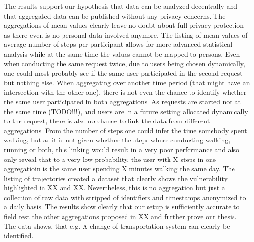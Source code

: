 The results support our hypothesis that data can be analyzed decentrally and that aggregated data can be published without any privacy concerns. The aggregations of mean values clearly leave no doubt about full privacy protection as there even is no personal data involved anymore. The listing of mean values of average number of steps per participant allows for more advanced statistical analysis while at the same time the values cannot be mapped to persons. Even when conducting the same request twice, due to users being chosen dynamically, one could most probably see if the same user participated in the second request but nothing else. When aggregating over another time period (that might have an intersection with the other one), there is not even the chance to identify whether the same user participated in both aggregations. As requests are started not at the same time (TODO!!!), and users are in a future setting allocated dynamically to the request, there is also no chance to link the data from different aggregations. From the number of steps one could infer the time somebody spent walking, but as it is not given whether the steps where conducting walking, running or both, this linking would result in a very poor performance and also only reveal that to a very low probability, the user with X steps in one aggregatioin is the same user spending X minutes walking the same day. 
The listing of trajectories created a dataset that clearly shows the vulnerability highlighted in XX and XX. Nevertheless, this is no aggregation but just a collection of raw data with stripped of identifiers and timestamps anonymized to a daily basis. The results show clearly that our setup is sufficiently accurate to field test the other aggregations proposed in XX and further prove our thesis. The data shows, that e.g. A change of transportation system can clearly be identified. 